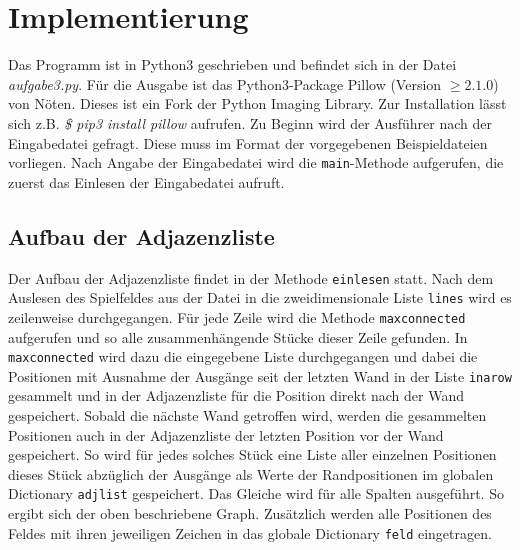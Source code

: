 \documentclass[12pt]{article}
\begin{document}
\section{Implementierung}
Das Programm ist in Python3 geschrieben und befindet sich in der Datei \textit{aufgabe3.py}. Für die Ausgabe ist das Python3-Package Pillow (Version $\geq 2.1.0$) von Nöten. Dieses ist ein Fork der Python Imaging Library. Zur Installation lässt sich z.B. \textit{\$ pip3 install pillow} aufrufen. Zu Beginn wird der Ausführer nach der Eingabedatei gefragt. Diese muss im Format der vorgegebenen Beispieldateien vorliegen. Nach Angabe der Eingabedatei wird die \texttt{main}-Methode aufgerufen, die zuerst das Einlesen der Eingabedatei aufruft. 

\subsection{Aufbau der Adjazenzliste}
Der Aufbau der Adjazenzliste findet in der Methode \texttt{einlesen} statt. Nach dem Auslesen des Spielfeldes aus der Datei in die zweidimensionale Liste \texttt{lines} wird es zeilenweise durchgegangen. Für jede Zeile wird die Methode \texttt{maxconnected} aufgerufen und so alle zusammenhängende Stücke dieser Zeile gefunden. In \texttt{maxconnected} wird dazu die eingegebene Liste durchgegangen und dabei die Positionen mit Ausnahme der Ausgänge seit der letzten Wand in der Liste \texttt{inarow} gesammelt und in der Adjazenzliste für die Position direkt nach der Wand gespeichert. Sobald die nächste Wand getroffen wird, werden die gesammelten Positionen auch in der Adjazenzliste der letzten Position vor der Wand gespeichert. So wird für jedes solches Stück eine Liste aller einzelnen Positionen dieses Stück abzüglich der Ausgänge als Werte der Randpositionen im globalen Dictionary \texttt{adjlist} gespeichert. Das Gleiche wird für alle Spalten ausgeführt. So ergibt sich der oben beschriebene Graph. Zusätzlich werden alle Positionen des Feldes mit ihren jeweiligen Zeichen in das globale Dictionary \texttt{feld} eingetragen.
\end{document}
